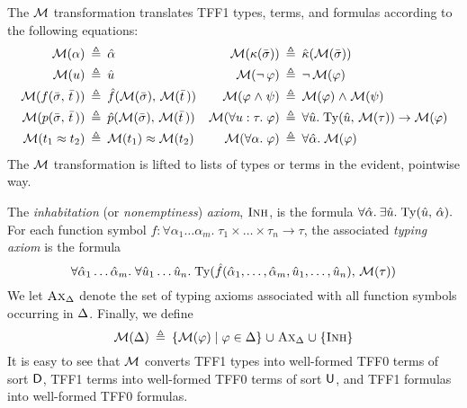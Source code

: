 The $\mathcal{M}$ transformation translates TFF1 types, terms, and formulas
according to the following equations:
\begin{align*}
\mathcal{M}(\alpha) &\:\triangleq\: \hat{\alpha} &
  \mathcal{M}(\kappa(\bar{\sigma})) &\:\triangleq\: \hat{\kappa}(\mathcal{M}(\bar{\sigma})) \\
\mathcal{M}(u) &\:\triangleq\: \hat{u} &
  \mathcal{M}(\lnot\, \varphi) &\:\triangleq\: \lnot\, \mathcal{M}(\varphi) \\
\mathcal{M}(f(\bar{\sigma},\,\bar{t}\,)) &\:\triangleq\: \hat{f}(\mathcal{M}(\bar{\sigma}),\,\mathcal{M}(\bar{t}\,)) &
  \mathcal{M}(\varphi \mathrel{\land} \psi) &\:\triangleq\: \mathcal{M}(\varphi) \mathrel{\land} \mathcal{M}(\psi) \\
\mathcal{M}(p(\bar{\sigma},\,\bar{t}\,)) &\:\triangleq\: \hat{p}(\mathcal{M}(\bar{\sigma}),\,\mathcal{M}(\bar{t}\,)) &
  \mathcal{M}(\forall u \mathrel{:} \tau .\; \varphi) &\:\triangleq\: \forall \hat{u} .\; \mathrm{Ty}(\hat{u},\, \mathcal{M}(\tau)) \rightarrow \mathcal{M}(\varphi) \\
\mathcal{M}(t_1 \approx t_2) &\:\triangleq\: \mathcal{M}(t_1) \approx \mathcal{M}(t_2) &
  \mathcal{M}(\forall \alpha .\; \varphi) &\:\triangleq\: \forall \hat{\alpha} .\; \mathcal{M}(\varphi)
\end{align*}
%
\newcommand{\AxD}{\text{\sc Ax}_{\DEL}}%
\newcommand{\Inh}{\text{\sc Inh}}%
\newcommand{\Dom}{\mathrm{Dom}}%
%
The $\mathcal{M}$ transformation is lifted to lists of types or terms in the evident,
pointwise way.

The {\em inhabitation} (or {\em nonemptiness}) {\em axiom}, $\Inh$, is the formula
$\forall \hat{\alpha}.\> \exists \hat{u} .\;
\mathrm{Ty}(\hat{u},\,\hat{\alpha}).$
For each function symbol $f :
\forall \alpha_1\dots\alpha_m .\; \tau_1 \times \dots \times \tau_n \to \tau$,
the associated {\em typing axiom\/} is the formula
$$
\forall \hat{\alpha}_1\dots\hat{\alpha}_m .\;
\forall \hat{u}_1\dots\hat{u}_n .\;
\typeof(\hat{f}(\hat{\alpha}_1,\dots,\hat{\alpha}_m,
\hat{u}_1,\dots,\hat{u}_n),\, \MON(\tau))%
$$
We let $\AxD$ denote the set of typing axioms associated with all function
symbols occurring in $\mathrm{\Delta}$.
%
Finally, we define
$$
\MON(\DEL) \eqdef \{ \MON(\varphi) \vb \varphi \in \DEL \} \mathrel\cup
\AxD \mathrel\cup \{ \Inh \}%
$$
%
It is easy to see that $\mathcal{M}$ converts TFF1 types into well-formed TFF0 terms of
sort $\mathsf{D}$, TFF1 terms into well-formed TFF0 terms of sort $\mathsf{U}$, and
TFF1 formulas into well-for\-med TFF0 formulas.

